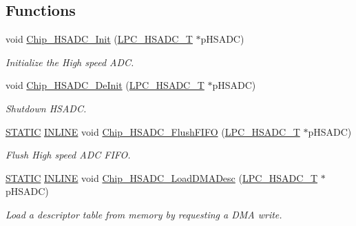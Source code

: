 \subsection*{Functions}
\begin{DoxyCompactItemize}
\item 
void \hyperlink{group___h_s_a_d_c__18_x_x__43_x_x_gad72fb94bbb485c84687a4e75c63090ea}{Chip\+\_\+\+H\+S\+A\+D\+C\+\_\+\+Init} (\hyperlink{struct_l_p_c___h_s_a_d_c___t}{L\+P\+C\+\_\+\+H\+S\+A\+D\+C\+\_\+T} $\ast$p\+H\+S\+A\+DC)
\begin{DoxyCompactList}\small\item\em Initialize the High speed A\+DC. \end{DoxyCompactList}\item 
void \hyperlink{group___h_s_a_d_c__18_x_x__43_x_x_ga2d9740d012a9043c462acbc468e1931d}{Chip\+\_\+\+H\+S\+A\+D\+C\+\_\+\+De\+Init} (\hyperlink{struct_l_p_c___h_s_a_d_c___t}{L\+P\+C\+\_\+\+H\+S\+A\+D\+C\+\_\+T} $\ast$p\+H\+S\+A\+DC)
\begin{DoxyCompactList}\small\item\em Shutdown H\+S\+A\+DC. \end{DoxyCompactList}\item 
\hyperlink{group___l_p_c___types___public___macros_ga10b2d890d871e1489bb02b7e70d9bdfb}{S\+T\+A\+T\+IC} \hyperlink{spifi__18xx__43xx_8h_a2eb6f9e0395b47b8d5e3eeae4fe0c116}{I\+N\+L\+I\+NE} void \hyperlink{group___h_s_a_d_c__18_x_x__43_x_x_ga9b6a95c8e73bf397768ea3f97ed7de25}{Chip\+\_\+\+H\+S\+A\+D\+C\+\_\+\+Flush\+F\+I\+FO} (\hyperlink{struct_l_p_c___h_s_a_d_c___t}{L\+P\+C\+\_\+\+H\+S\+A\+D\+C\+\_\+T} $\ast$p\+H\+S\+A\+DC)
\begin{DoxyCompactList}\small\item\em Flush High speed A\+DC F\+I\+FO. \end{DoxyCompactList}\item 
\hyperlink{group___l_p_c___types___public___macros_ga10b2d890d871e1489bb02b7e70d9bdfb}{S\+T\+A\+T\+IC} \hyperlink{spifi__18xx__43xx_8h_a2eb6f9e0395b47b8d5e3eeae4fe0c116}{I\+N\+L\+I\+NE} void \hyperlink{group___h_s_a_d_c__18_x_x__43_x_x_gab01d315ee383688f0dea4aa939e5220f}{Chip\+\_\+\+H\+S\+A\+D\+C\+\_\+\+Load\+D\+M\+A\+Desc} (\hyperlink{struct_l_p_c___h_s_a_d_c___t}{L\+P\+C\+\_\+\+H\+S\+A\+D\+C\+\_\+T} $\ast$p\+H\+S\+A\+DC)
\begin{DoxyCompactList}\small\item\em Load a descriptor table from memory by requesting a D\+MA write. \end{DoxyCompactList}\item 

\end{DoxyCompactItemize}

